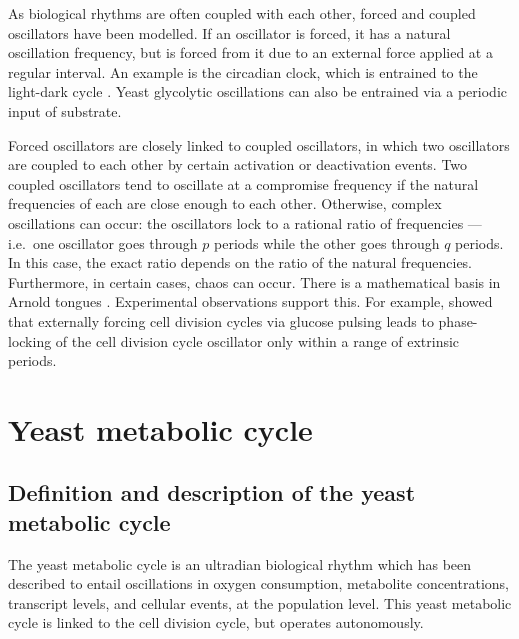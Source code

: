 As biological rhythms are often coupled with each other, forced and coupled oscillators have been modelled.
If an oscillator is forced, it has a natural oscillation frequency, but is forced from it due to an external force applied at a regular interval.
An example is the circadian clock, which is entrained to the light-dark cycle \parencite{goldbeterMultisynchronizationOtherPatterns}.
Yeast glycolytic oscillations can also be entrained via a periodic input of substrate.

Forced oscillators are closely linked to coupled oscillators, in which two oscillators are coupled to each other by certain activation or deactivation events.
Two coupled oscillators tend to oscillate at a compromise frequency if the natural frequencies of each are close enough to each other.
Otherwise, complex oscillations can occur: the oscillators lock to a rational ratio of frequencies --- i.e.\ one oscillator goes through $p$ periods while the other goes through $q$ periods.
In this case, the exact ratio depends on the ratio of the natural frequencies.
Furthermore, in certain cases, chaos can occur.
There is a mathematical basis in Arnold tongues \parencite{heltbergTaleTwoRhythms2021}.
Experimental observations support this.
For example, \textcite{charvinForcedPeriodicExpression2009} showed that externally forcing cell division cycles via glucose pulsing leads to phase-locking of the cell division cycle oscillator only within a range of extrinsic periods.


\section{Yeast metabolic cycle}
\label{sec:intro-ymc}

\subsection{Definition and description of the yeast metabolic cycle}
\label{subsec:intro-ymc-definition}

The yeast metabolic cycle is an ultradian biological rhythm which has been described to entail oscillations in oxygen consumption, metabolite concentrations, transcript levels, and cellular events, at the population level.
This yeast metabolic cycle is linked to the cell division cycle, but operates autonomously.

